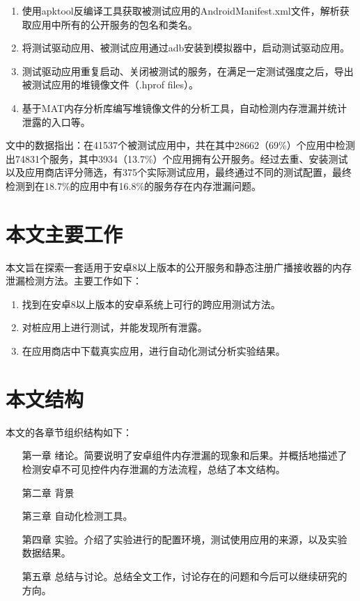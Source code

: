 \begin{enumerate}
	\item 使用apktool反编译工具\cite{apktool}获取被测试应用的AndroidManifest.xml文件，解析获取应用中所有的公开服务的包名和类名。
	\item 将测试驱动应用、被测试应用通过adb安装到模拟器中，启动测试驱动应用。
	\item 测试驱动应用重复启动、关闭被测试的服务，在满足一定测试强度之后，导出被测试应用的堆镜像文件（.hprof files）。
	\item 基于MAT内存分析库\cite{mat}编写堆镜像文件的分析工具，自动检测内存泄漏并统计泄露的入口等。
\end{enumerate}

\label{pre-result}
文中的数据指出：在41537个被测试应用中，共在其中28662（69\%）个应用中检测出74831个服务，其中3934（13.7\%）个应用拥有公开服务。经过去重、安装测试以及应用商店评分筛选，有375个实际测试应用，最终通过不同的测试配置，最终检测到在18.7\%的应用中有16.8\%的服务存在内存泄漏问题。


\section{本文主要工作}
本文旨在探索一套适用于安卓8以上版本的公开服务和静态注册广播接收器的内存泄漏检测方法。主要工作如下：
\begin{enumerate}
\item 找到在安卓8以上版本的安卓系统上可行的跨应用测试方法。

\item 对桩应用上进行测试，并能发现所有泄露。

\item 在应用商店中下载真实应用，进行自动化测试分析实验结果。

\end{enumerate}
\section{本文结构}
本文的各章节组织结构如下：
\begin{itemize}
	\item[第一章] 绪论。简要说明了安卓组件内存泄漏的现象和后果。并概括地描述了检测安卓不可见控件内存泄漏的方法流程，总结了本文结构。
	\item[第二章] 背景
	\item[第三章] 自动化检测工具。
	\item[第四章] 实验。介绍了实验进行的配置环境，测试使用应用的来源，以及实验数据结果。
	\item[第五章] 总结与讨论。总结全文工作，讨论存在的问题和今后可以继续研究的方向。
\end{itemize}